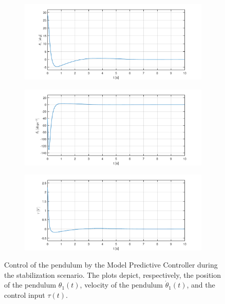 \begin{figure}[H]
	\centering
	\begin{subfigure}
		\centering
		\includegraphics[scale=0.6]{images/MPC/pend.pdf}  
	\end{subfigure}
	\begin{subfigure}
		\centering
		\includegraphics[scale=0.6]{images/MPC/dpend.pdf}  
	\end{subfigure}
	\begin{subfigure}
		\centering
		\includegraphics[scale=0.6]{images/MPC/control.pdf}  
	\end{subfigure}
	\caption{Control of the pendulum by the Model Predictive Controller during the stabilization scenario. The plots depict, respectively, the position of the pendulum $\theta_1(t)$, velocity of the pendulum $\dot{\theta}_1(t)$, and the control input $\tau(t)$.}
	\label{mpc1}
\end{figure}
